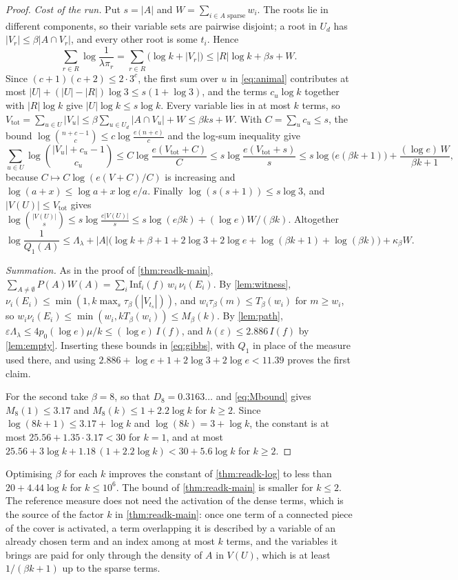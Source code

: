 \documentclass[11pt]{amsart}
\theoremstyle{definition}
\theoremstyle{remark}
\newcommand{\Inf}{\mathrm{Inf}}
\begin{document}
\begin{proof}
\emph{Cost of the run.} Put $s=|A|$ and $W=\sum_{i\in A\text{ sparse}}w_i$. The roots lie in different components,
so their variable sets are pairwise disjoint; a root in $U_d$ has $|V_r|\le\beta|A\cap V_r|$, and every other root is
some $t_i$. Hence
\[
\sum_{r\in R}\log\frac1{\lambda\pi_r}=\sum_{r\in R}\bigl(\log k+|V_r|\bigr)\le|R|\log k+\beta s+W.
\]
Since $(c+1)(c+2)\le2\cdot3^c$, the first sum over $u$ in \eqref{eq:animal} contributes at most $|U|+(|U|-|R|)\log3
\le s(1+\log3)$, and the terms $c_u\log k$ together with $|R|\log k$ give $|U|\log k\le s\log k$. Every variable lies
in at most $k$ terms, so $V_{\mathrm{tot}}=\sum_{u\in U}|V_u|\le\beta\sum_{u\in U_d}|A\cap V_u|+W\le\beta ks+W$. With
$C=\sum_uc_u\le s$, the bound $\log\binom{n+c-1}{c}\le c\log\frac{e(n+c)}c$ and the log-sum inequality give
\[
\sum_{u\in U}\log\binom{|V_u|+c_u-1}{c_u}\le C\log\frac{e(V_{\mathrm{tot}}+C)}{C}\le s\log\frac{e(V_{\mathrm{tot}}+s)}s
\le s\log\bigl(e(\beta k+1)\bigr)+\frac{(\log e)\,W}{\beta k+1},
\]
because $C\mapsto C\log(e(V+C)/C)$ is increasing and $\log(a+x)\le\log a+x\log e/a$. Finally
$\log(s(s+1))\le s\log3$, and $|V(U)|\le V_{\mathrm{tot}}$ gives
$\log\binom{|V(U)|}s\le s\log\frac{e|V(U)|}s\le s\log(e\beta k)+(\log e)W/(\beta k)$. Altogether
\[
\log\frac1{Q_1(A)}\le\Lambda_\lambda+|A|\bigl(\log k+\beta+1+2\log3+2\log e+\log(\beta k+1)+\log(\beta k)\bigr)
+\kappa_\beta W .
\]

\emph{Summation.} As in the proof of \cref{thm:readk-main}, $\sum_{A\ne\emptyset}P(A)W(A)=\sum_i\Inf_i(f)\,w_i\,
\nu_i(E_i)$. By \cref{lem:witness}, $\nu_i(E_i)\le\min(1,k\max_s\tau_\beta(|V_{t_s}|))$, and $w_i\tau_\beta(m)\le
T_\beta(w_i)$ for $m\ge w_i$, so $w_i\nu_i(E_i)\le\min(w_i,kT_\beta(w_i))\le M_\beta(k)$. By \cref{lem:path},
$\varepsilon\Lambda_\lambda\le4p_0(\log e)\mu/k\le(\log e)\,I(f)$, and $h(\varepsilon)\le2.886\,I(f)$ by
\cref{lem:empty}. Inserting these bounds in \eqref{eq:gibbs}, with $Q_1$ in place of the measure used there, and
using $2.886+\log e+1+2\log3+2\log e<11.39$ proves the first claim.

For the second take $\beta=8$, so that $D_8=0.3163\ldots$ and \eqref{eq:Mbound} gives $M_8(1)\le3.17$ and
$M_8(k)\le1+2.2\log k$ for $k\ge2$. Since $\log(8k+1)\le3.17+\log k$ and $\log(8k)=3+\log k$, the constant is at most
$25.56+1.35\cdot3.17<30$ for $k=1$, and at most $25.56+3\log k+1.18\,(1+2.2\log k)<30+5.6\log k$ for $k\ge2$.
\end{proof}

Optimising $\beta$ for each $k$ improves the constant of \cref{thm:readk-log} to less than $20+4.44\log k$ for
$k\le10^6$. The bound of \cref{thm:readk-main} is smaller for $k\le2$. The reference measure does not need the
activation of the dense terms, which is the source of the factor $k$ in \cref{thm:readk-main}: once one term of a
connected piece of the cover is activated, a term overlapping it is described by a variable of an already chosen term
and an index among at most $k$ terms, and the variables it brings are paid for only through the density of $A$ in
$V(U)$, which is at least $1/(\beta k+1)$ up to the sparse terms.
\end{document}
